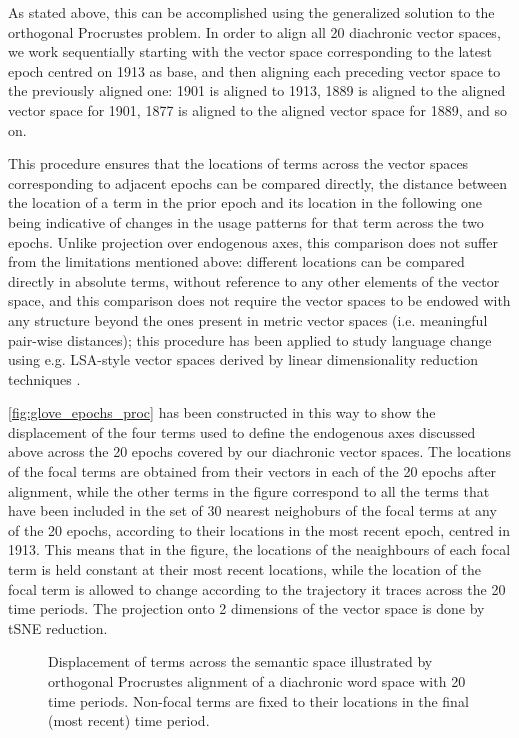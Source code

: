 As stated above, this can be accomplished using the generalized solution to the orthogonal Procrustes problem.
In order to align all 20 diachronic vector spaces, we work sequentially starting with the vector space corresponding to the latest epoch centred on 1913 as base, and then aligning each preceding vector space to the previously aligned one: 1901 is aligned to 1913, 1889 is aligned to the aligned vector space for 1901, 1877 is aligned to the aligned vector space for 1889, and so on.

This procedure ensures that the locations of terms across the vector spaces corresponding to adjacent epochs can be compared directly, the distance between the location of a term in the prior epoch and its location in the following one being indicative of changes in the usage patterns for that term across the two epochs.
Unlike projection over endogenous axes, this comparison does not suffer from the limitations mentioned above: different locations can be compared directly in absolute terms, without reference to any other elements of the vector space, and this comparison does not require the vector spaces to be endowed with any structure beyond the ones present in metric vector spaces (i.e. meaningful pair-wise distances); this procedure has been applied to study language change using e.g. LSA-style vector spaces derived by linear dimensionality reduction techniques \citep[, op. cit.]{hamilton2016}.

\autoref{fig:glove_epochs_proc} has been constructed in this way to show the displacement of the four terms used to define the endogenous axes discussed above across the 20 epochs covered by our diachronic vector spaces.
The locations of the focal terms are obtained from their vectors in each of the 20 epochs after alignment, while the other terms in the figure correspond to all the terms that have been included in the set of 30 nearest neighoburs of the focal terms at any of the 20 epochs, according to their locations in the most recent epoch, centred in 1913.
This means that in the figure, the locations of the neaighbours of each focal term is held constant at their most recent locations, while the location of the focal term is allowed to change according to the trajectory it traces across the 20 time periods.
The projection onto 2 dimensions of the vector space is done by tSNE reduction.

\begin{figure}
    \centerfloat
    
    \caption[Displacement of terms in aligned word spaces across 20 time periods]{
        Displacement of terms across the semantic space illustrated by orthogonal Procrustes alignment of a diachronic word space with 20 time periods.
        Non-focal terms are fixed to their locations in the final (most recent) time period.
    }
    \label{fig:glove_epochs_proc}
\end{figure}

